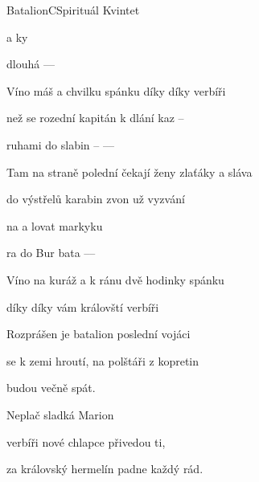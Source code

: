 \begin{song}{Batalion}{C}{Spirituál Kvintet}

\begin{SBChorus}
  a ky

dlouhá   ---- 

Víno máš a chvilku spánku díky díky verbíři
\end{SBChorus}
\begin{SBVerse}
 než se rozední kapitán k dlání kaz --

ruhami do slabin -- ----

Tam na straně polední čekají ženy zlaťáky a sláva

do výstřelů karabin zvon už vyzvání
\end{SBVerse}
\begin{SBChorus}
 na  a lovat markyku

ra do Bur bata ----

Víno na kuráž a k ránu dvě hodinky spánku

díky díky vám královští verbíři

\end{SBChorus}
\begin{SBVerse}
Rozprášen je batalion poslední vojáci

se k zemi hroutí, na polštáři z kopretin

budou večně spát.

Neplač sladká Marion

verbíři nové chlapce přivedou ti,

za královský hermelín padne každý rád.
\end{SBVerse}
\end{song}
\pagebreak
